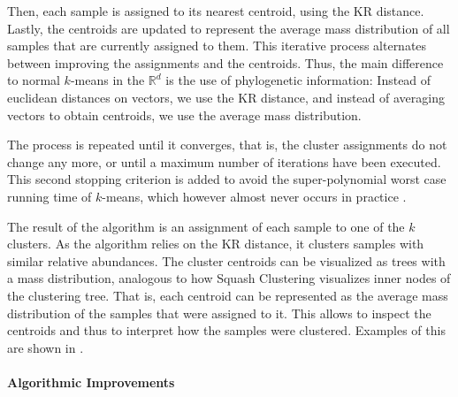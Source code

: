 Then, each sample is assigned to its nearest centroid, using the KR distance. %
Lastly, the centroids are updated to represent
the average mass distribution of all samples that are currently assigned to them.
This iterative process alternates between improving the assignments and the centroids.
Thus, the main difference to normal $k$-means in the $\mathbb{R}^d$ is the use of phylogenetic information:
Instead of euclidean distances on vectors, we use the KR distance,
and instead of averaging vectors to obtain centroids, we use the average mass distribution.

The process is repeated until it converges,
that is, the cluster assignments do not change any more,
or until a maximum number of iterations have been executed.
This second stopping criterion is added to avoid the super-polynomial worst case running time of $k$-means,
which however almost never occurs in practice \cite{Bottou1995,Arthur2006}.

The result of the algorithm is an assignment of each sample to one of the $k$ clusters.
As the algorithm relies on the KR distance, it clusters samples with similar relative abundances.
The cluster centroids can be visualized as trees with a mass distribution,
analogous to how Squash Clustering visualizes inner nodes of the clustering tree.
That is, each centroid can be represented as the average mass distribution of the samples that were assigned to it.
This allows to inspect the centroids and thus to interpret how the samples were clustered.
Examples of this are shown in .


\paragraph{Algorithmic Improvements}
\label{ch:Clustering:sec:Methods:sub:PhylogeneticKmeans:par:AlgorithmicImprovements}

